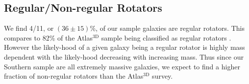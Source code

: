 \documentclass[a4paper,fleqn,usenatbib]{mnras}
\begin{document}
\begin{table}
\begin{tabular}{l c c c c c c c}
		\end{tabular}
	\end{table}

	\subsection{Regular/Non-regular Rotators}
		\label{subsec:RR}
		We find 4/11, or $(36\pm15)$\%, of our sample galaxies are regular rotators. This compares to 82\% of the Atlas$^\text{3D}$ sample being classified as regular rotators \citep{Krajnovic2011}. However the likely-hood of a given galaxy being a regular rotator is highly mass dependent with the likely-hood decreasing with increasing mass. Thus since our Southern sample are all extremely massive galaxies, we expect to find a higher fraction of non-regular rotators than the Atlas$^\text{3D}$ survey.
	
\end{document}
